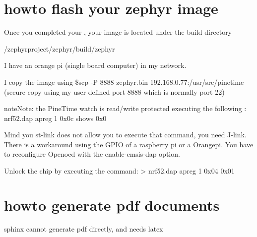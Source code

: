 \documentclass[letterpaper,10pt,english]{sphinxmanual}
\begin{document}
\chapter{howto flash your zephyr image}
\label{\detokenize{writeprotection:howto-flash-your-zephyr-image}}\label{\detokenize{writeprotection:flashing}}\label{\detokenize{writeprotection::doc}}
Once you completed your  , your image is located under the build directory

\begin{sphinxVerbatim}[commandchars=\\\{\}]
  \PYGZti{}/zephyrproject/zephyr/build/zephyr
\end{sphinxVerbatim}

I have an orange pi (single board computer) in my network.

I copy the image using \$scp -P 8888 zephyr.bin 192.168.0.77:/usr/src/pinetime
(secure copy using my user defined port 8888 which is normally port 22)

\begin{sphinxadmonition}{note}{Note:}
the PineTime watch is read/write protected
executing the following : nrf52.dap apreg 1 0x0c shows 0x0

Mind you st-link does not allow you to execute that command, you need J-link.
There is a workaround using the GPIO of a raspberry pi or a Orangepi.
You have to reconfigure Openocd with the \textendash{}enable-cmsis-dap option.

Unlock the chip by executing the command:
\textgreater{} nrf52.dap apreg 1 0x04 0x01
\end{sphinxadmonition}


\chapter{howto generate pdf documents}
\label{\detokenize{latexpdf:howto-generate-pdf-documents}}\label{\detokenize{latexpdf::doc}}
sphinx cannot generate pdf directly, and needs latex

\begin{sphinxVerbatim}[commandchars=\\\{\}]
  
  
  
  
  
  
\end{sphinxVerbatim}



\renewcommand{\indexname}{Index}
\printindex
\end{document}
